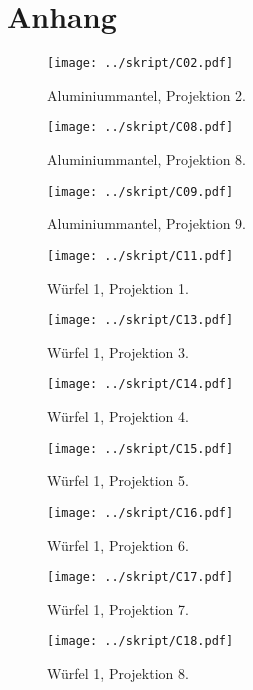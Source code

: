 \section{Anhang}
\begin{figure}[htbp]
	\begin{minipage}{0.5\textwidth}
	\texttt{[image: ../skript/C02.pdf]}
	\caption{Aluminiummantel, Projektion 2.}
	\end{minipage}
	\hfill
	\begin{minipage}{0.5\textwidth}
	\texttt{[image: ../skript/C08.pdf]}
	\caption{Aluminiummantel, Projektion 8.}
	\end{minipage}
\end{figure}

\begin{figure}[htbp]
	\begin{minipage}{0.5\textwidth}
	\texttt{[image: ../skript/C09.pdf]}
	\caption{Aluminiummantel, Projektion 9.}
	\end{minipage}
	\hfill
	\begin{minipage}{0.5\textwidth}
	\texttt{[image: ../skript/C11.pdf]}
	\caption{Würfel 1, Projektion 1.}
	\end{minipage}
\end{figure}

\begin{figure}[htbp]
	\begin{minipage}{0.5\textwidth}
	\texttt{[image: ../skript/C13.pdf]}
	\caption{Würfel 1, Projektion 3.}
	\end{minipage}
	\hfill
	\begin{minipage}{0.5\textwidth}
	\texttt{[image: ../skript/C14.pdf]}
	\caption{Würfel 1, Projektion 4.}
	\end{minipage}
\end{figure}

\begin{figure}[htbp]
	\begin{minipage}{0.5\textwidth}
	\texttt{[image: ../skript/C15.pdf]}
	\caption{Würfel 1, Projektion 5.}
	\end{minipage}
	\hfill
	\begin{minipage}{0.5\textwidth}
	\texttt{[image: ../skript/C16.pdf]}
	\caption{Würfel 1, Projektion 6.}
	\end{minipage}
\end{figure}

\begin{figure}[htbp]
	\begin{minipage}{0.5\textwidth}
	\texttt{[image: ../skript/C17.pdf]}
	\caption{Würfel 1, Projektion 7.}
	\end{minipage}
	\hfill
	\begin{minipage}{0.5\textwidth}
	\texttt{[image: ../skript/C18.pdf]}
	\caption{Würfel 1, Projektion 8.}
	\end{minipage}
\end{figure}

